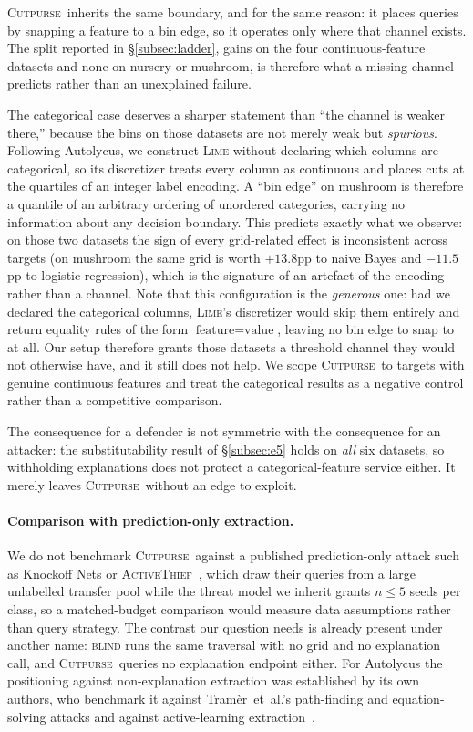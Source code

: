 \documentclass[sigconf,anonymous,review]{acmart}
\newcommand{\sys}{\textsc{Cutpurse}}
\begin{document}
\sys\ inherits the same boundary, and for the same reason: it places queries by snapping a feature to
a bin edge, so it operates only where that channel exists. The split reported in
\S\ref{subsec:ladder}, gains on the four continuous-feature datasets and none on nursery or mushroom,
is therefore what a missing channel predicts rather than an unexplained failure.

The categorical case deserves a sharper statement than ``the channel is weaker there,'' because the
bins on those datasets are not merely weak but \emph{spurious}. Following Autolycus, we construct
\textsc{Lime} without declaring which columns are categorical, so its discretizer treats every column
as continuous and places cuts at the quartiles of an integer label encoding. A ``bin edge'' on
mushroom is therefore a quantile of an arbitrary ordering of unordered categories, carrying no
information about any decision boundary. This predicts exactly what we observe: on those two datasets
the sign of every grid-related effect is inconsistent across targets (on mushroom the same grid is worth $+13.8$pp to naive Bayes and $-11.5$pp to logistic regression), which is the signature of an
artefact of the encoding rather than a channel. Note that this configuration is the
\emph{generous} one: had we declared the categorical columns, \textsc{Lime}'s discretizer would skip
them entirely and return equality rules of the form $\text{feature}{=}\text{value}$, leaving no bin
edge to snap to at all. Our setup therefore grants those datasets a threshold channel they would not
otherwise have, and it still does not help. We scope \sys\ to targets with genuine continuous
features and treat the categorical results as a negative control rather than a competitive
comparison.

The consequence for a defender is not symmetric with the consequence for an attacker: the
substitutability result of \S\ref{subsec:e5} holds on \emph{all} six datasets, so withholding
explanations does not protect a categorical-feature service either. It merely leaves \sys\ without an
edge to exploit.

\paragraph{Comparison with prediction-only extraction.} We do not benchmark \sys\ against a
published prediction-only attack such as Knockoff Nets or
\textsc{ActiveThief}~\cite{orekondy2019knockoff,pal2020activethief}, which draw their queries from a
large unlabelled transfer pool while the threat model we inherit grants $n{\le}5$ seeds per class, so
a matched-budget comparison would measure data assumptions rather than query strategy. The contrast
our question needs is already present under another name: \textsc{blind} runs the same traversal with
no grid and no explanation call, and \sys\ queries no explanation endpoint either. For Autolycus the
positioning against non-explanation extraction was established by its own authors, who benchmark it
against Tram\`er~et~al.'s path-finding and equation-solving attacks and against active-learning
extraction~\cite{tramer2016stealing,chandrasekaran2020active}.
\end{document}
